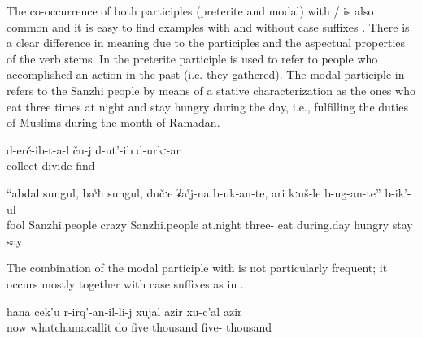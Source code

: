 The co-occurrence of both participles (preterite and modal) with \slash{} is also common and it is easy to find examples with  and without case suffixes . There is a clear difference in meaning due to the participles and the aspectual properties of the verb stems. In  the preterite participle is used to refer to people who accomplished an action in the past (i.e. they gathered). The modal participle in  refers to the Sanzhi people by means of a stative characterization as the ones who eat three times at night and stay hungry during the day, i.e., fulfilling the duties of Muslims during the month of Ramadan.
%
\begin{exe}
	\ex	\label{ex:‎‎‎The ones that gathered (the food) probably divided it among themselves}
	\gll	d-erč-ib-t-a-l	ču-j	d-ut'-ib	d-urkː-ar\\
		collect		divide	find\\
	\glt	{}

	\ex	\label{ex:‎‎Foolish Sanzhi people, crazy Sаnzhi people, at night they eat three times, and during day they stay hungry they said}
	\gll	``abdal	sungul,		baˁħ	sungul,		dučːe		ʡaˁj-na	b-uk-an-te, 					ari 		kːuš-le		b-ug-an-te'' 							b-ik'-ul\\
		fool	Sanzhi.people	crazy	Sanzhi.people	at.night	three-	eat 	during.day	hungry	\tsc{hpl-}stay 	say\\
	\glt	{}
\end{exe}


The combination of the modal participle with  is not particularly frequent; it occurs mostly together with case suffixes as in . 

\begin{exe}
	\ex	\label{ex:‎now for the one who operates her 5000, 50000 rubles}
	\gll	hana	cek'u	r-irq'-an-il-li-j	xujal	azir	xu-c'al	azir\\
		now	whatchamacallit	do	five	thousand	five-	thousand\\
	\glt	{}
\end{exe}

